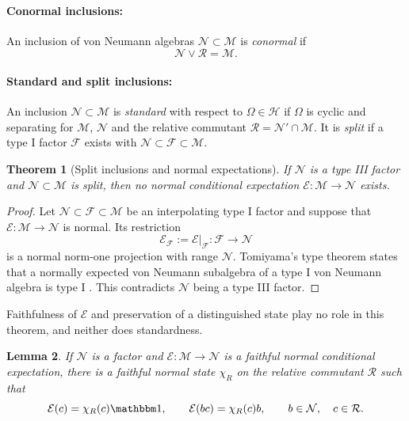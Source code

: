 \documentclass[a4paper,11pt]{article}
\newtheorem{theorem}{Theorem}
\newtheorem{lemma}[theorem]{Lemma}
\theoremstyle{definition}
\newcommand{\mE}{\mathcal{E}}
\begin{document}
\paragraph{Conormal inclusions:} An inclusion of von Neumann algebras $\mathcal N\subset \mathcal M$ is \emph{conormal} if
\begin{equation}
 \mathcal N\vee\mathcal R=\mathcal M.
\end{equation}
\paragraph{Standard and split inclusions:}
An inclusion $\mathcal N\subset\mathcal M$ is
\emph{standard} with respect to $\Omega\in\mathcal H$ if $\Omega$ is cyclic
and separating for $\mathcal M$, $\mathcal N$ and the relative commutant $\mathcal R=\mathcal N'\cap \mathcal M$. It is \emph{split} if a type I factor $\mathcal F$ exists with
$\mathcal N\subset\mathcal F\subset\mathcal M$.

\begin{theorem}[Split inclusions and normal expectations]\label{thm:split-no-expectation}
If $\mathcal N$ is a type III factor and
$\mathcal N\subset\mathcal M$ is split, then no normal conditional expectation
$\mE:\mathcal M\to\mathcal N$ exists.  
\end{theorem}

\begin{proof}
Let $\mathcal N\subset\mathcal F\subset\mathcal M$ be an interpolating type I
factor and suppose that $\mE:\mathcal M\to \mathcal N$ is normal.  Its restriction
\begin{equation}
 \mE_{\mathcal F}:=\mE|_{\mathcal F}:\mathcal F\longrightarrow\mathcal N
\end{equation}
is a normal norm-one projection with range $\mathcal N$.  Tomiyama's type
theorem states that a normally expected von Neumann subalgebra of a type I von
Neumann algebra is type I \cite{Tomiyama1959}\cite{Takesaki1972}. This contradicts $\mathcal N$ being a type III factor.
\end{proof}

Faithfulness of $\mE$ and preservation of a distinguished state play no role in this theorem, and neither does standardness.

\begin{lemma}\label{lem:expectation-slice}
If $\mathcal N$ is a factor and $\mE:\mathcal M\to\mathcal N$ is a faithful
normal conditional expectation, there is a faithful normal state $\chi_R$ on
the relative commutant $\mathcal R$ such that
\begin{equation}
 \mE(c)=\chi_R(c)\mathbbm 1,
 \qquad \mE(b c)=\chi_R(c)b,
 \qquad b\in\mathcal N,\quad c\in\mathcal R.
\end{equation}
\end{lemma}
\end{document}
